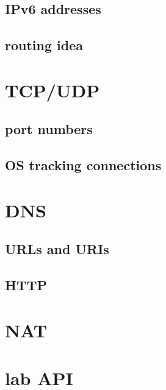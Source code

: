 \subsection{IPv6 addresses}


\subsection{routing idea}


% 

\section{TCP/UDP}

\subsection{port numbers}




\subsection{OS tracking connections}
% 


\section{DNS}


\subsection{URLs and URIs}


\subsection{HTTP}



% 

\section{NAT}


\section{lab API}

